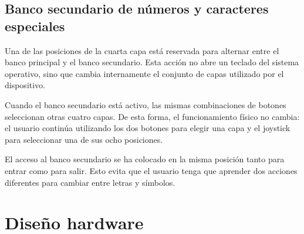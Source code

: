 \subsection{Banco secundario de números y caracteres especiales}
\label{subsec:teclado-secundario}

Una de las posiciones de la cuarta capa está reservada para alternar entre el banco principal y el banco secundario. Esta acción no abre un teclado del sistema operativo, sino que cambia internamente el conjunto de capas utilizado por el dispositivo.

Cuando el banco secundario está activo, las mismas combinaciones de botones seleccionan otras cuatro capas. De esta forma, el funcionamiento físico no cambia: el usuario continúa utilizando los dos botones para elegir una capa y el joystick para seleccionar una de sus ocho posiciones.

\begin{table}[ht]
    \centering
    \caption{Distribución del banco secundario}
    \label{tab:capas-secundarias}
\end{table}

El acceso al banco secundario se ha colocado en la misma posición tanto para entrar como para salir. Esto evita que el usuario tenga que aprender dos acciones diferentes para cambiar entre letras y símbolos.

\section{Diseño hardware}
\label{sec:diseno-hardware}

